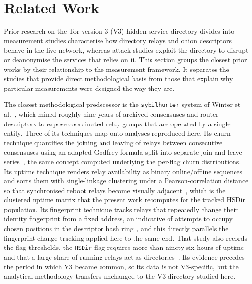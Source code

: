 \documentclass[conference]{IEEEtran}
\begin{document}
\section{Related Work}

Prior research on the Tor version 3 (V3) hidden service directory divides into measurement studies characterise how directory relays and onion descriptors behave in the live network, whereas attack studies exploit the directory to disrupt or deanonymise the services that relies on it. This section groups the closest prior 
works by their relationship to the measurement framework. It separates the studies that provide direct methodological basis from those that explain why particular measurements were designed the way they are.

The closest methodological predecessor is the \texttt{sybilhunter} system of Winter et al.~\cite{winter2016sybil}, which mined roughly nine years of archived consensuses and router descriptors to expose coordinated relay groups that are operated by a single entity. Three of its techniques map onto analyses reproduced 
here. Its churn technique quantifies the joining and leaving of relays between consecutive consensuses using an adapted Godfrey formula split into separate join and leave series~\cite{winter2016sybil}, the same concept computed underlying the per-flag churn distributions. Its uptime technique renders relay availability 
as binary online/offline sequences and sorts them with single-linkage clustering under a Pearson-correlation distance so that synchronised reboot relays become visually adjacent~\cite{winter2016sybil}, which is the clustered uptime matrix that the present work recomputes for the tracked HSDir population. 
Its fingerprint technique tracks relays that repeatedly change their identity fingerprint from a fixed address, an indicative of attempts to occupy chosen positions in the descriptor hash ring~\cite{winter2016sybil}, and this directly parallels the fingerprint-change tracking applied here to the same end. 
That study also records the flag thresholds, the \texttt{HSDir} flag requires more than ninety-six hours of uptime and that a large share of running relays act as directories~\cite{winter2016sybil}. Its evidence precedes the period in which V3 became common, so its data is not V3-specific, but the analytical methodology 
transfers unchanged to the V3 directory studied here.
 
\end{document}
